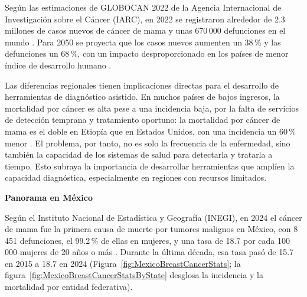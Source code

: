 Según las estimaciones de GLOBOCAN 2022 de la Agencia Internacional de Investigación sobre el Cáncer
(IARC), en 2022 se registraron alrededor de 2.3 millones de casos nuevos de cáncer de mama y unas
670\,000 defunciones en el mundo \cite{Bray2024GLOBOCAN, GLOBOCAN2022}. Para 2050 se proyecta que los
casos nuevos aumenten un 38\,\% y las defunciones un 68\,\%, con un impacto desproporcionado en los
países de menor índice de desarrollo humano \cite{Kim2025GlobalBreastCancer}.

Las diferencias regionales tienen implicaciones directas para el desarrollo de herramientas de
diagnóstico asistido. %
En muchos países de bajos ingresos, la mortalidad por cáncer es alta pese a una incidencia baja, por
la falta de servicios de detección temprana y tratamiento oportuno: la mortalidad por cáncer de mama
es el doble en Etiopía que en Estados Unidos, con una incidencia un 60\,\% menor \cite{GlobalCancerStatistics2024}. El problema, por tanto, no es solo la frecuencia de la enfermedad, sino también la capacidad de los sistemas de salud para detectarla y tratarla a tiempo. Esto subraya la importancia de desarrollar herramientas que amplíen la capacidad diagnóstica, especialmente en regiones con recursos limitados.

\textbf{Panorama en México}

Según el Instituto Nacional de Estadística y Geografía (INEGI), en 2024 el cáncer de mama fue la primera causa de muerte por tumores malignos en México, con 8\,451 defunciones, el 99.2\,\% de ellas en mujeres, y una tasa de 18.7 por cada 100\,000 mujeres de 20 años o más
\cite{INEGI2025}. Durante la última década, esa tasa pasó de 15.7 en 2015 a 18.7 en 2024 (Figura~\ref{fig:MexicoBreastCancerStats}; la figura~\ref{fig:MexicoBreastCancerStatsByState} desglosa la incidencia y la mortalidad por entidad federativa).


